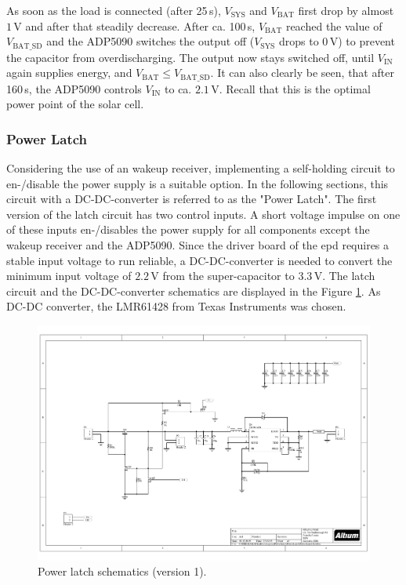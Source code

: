 As soon as the load is connected (after 25\,s), $V_{\text{SYS}}$ and $V_{\text{BAT}}$ first drop by almost $1\,\text{V}$ and after that steadily decrease.
After ca. 100\,s, $V_{\text{BAT}}$ reached the value of $V_{\text{BAT\_SD}}$ and the ADP5090 switches the output off ($V_{\text{SYS}}$ drops to 0\,V) to prevent the capacitor from overdischarging.
The output now stays switched off, until $V_{\text{IN}}$ again supplies energy, and $V_{\text{BAT}} \le V_{\text{BAT\_SD}}$.
It can also clearly be seen, that after 160\,s, the ADP5090 controls $V_{\text{IN}}$ to ca. $2.1\,\text{V}$. Recall that this is the optimal power point of the solar cell.

\clearpage
\subsubsection{Power Latch}
Considering the use of an wakeup receiver, implementing a self-holding circuit to en-/disable the power supply is a suitable option.
In the following sections, this circuit with a DC-DC-converter is referred to as the "Power Latch".
The first version of the latch circuit has two control inputs. A short voltage impulse on one of these inputs en-/disables the power supply for all components except the wakeup receiver and the ADP5090. Since the driver board of the \acs{epd} requires a stable input voltage to run reliable, a DC-DC-converter is needed to convert the minimum input voltage of $2.2\,\text{V}$ from the super-capacitor to $3.3\,\text{V}$. The latch circuit and the DC-DC-converter schematics are displayed in the Figure \ref{development:scematicV1}.
As DC-DC converter, the LMR61428 from Texas Instruments was chosen.
\begin{figure}[ht]
	\centering
	\includegraphics[clip, trim=4cm 5cm 2cm 6cm, width=1\textwidth]{4-development/hardware/graphics/PowerLatch/PwrLatch_V1_sch.pdf}
	\caption{Power latch schematics (version 1).\label{development:scematicV1}}
\end{figure}


